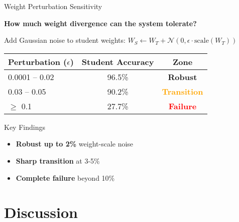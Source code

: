 \documentclass{beamer}
\begin{document}
\begin{frame}{Weight Perturbation Sensitivity}

\textbf{How much weight divergence can the system tolerate?}

\vspace{0.5em}

Add Gaussian noise to student weights: $W_S \gets W_T + \mathcal{N}(0, \epsilon \cdot \text{scale}(W_T))$

\vspace{1em}

\begin{table}
\centering
\small
\begin{tabular}{lcc}
\toprule
Perturbation ($\epsilon$) & Student Accuracy & Zone \\
\midrule
0.0001 -- 0.02 & 96.5\% & \textcolor{green!60!black}{\textbf{Robust}} \\
0.03 -- 0.05 & 90.2\% & \textcolor{orange}{\textbf{Transition}} \\
$\geq$ 0.1 & 27.7\% & \textcolor{red}{\textbf{Failure}} \\
\bottomrule
\end{tabular}
\end{table}

\vspace{1em}

\begin{block}{Key Findings}
\begin{itemize}
    \item \textbf{Robust up to 2\%} weight-scale noise
    \item \textbf{Sharp transition} at 3-5\%
    \item \textbf{Complete failure} beyond 10\%
\end{itemize}
\end{block}

\end{frame}

\section{Discussion}
\end{document}

